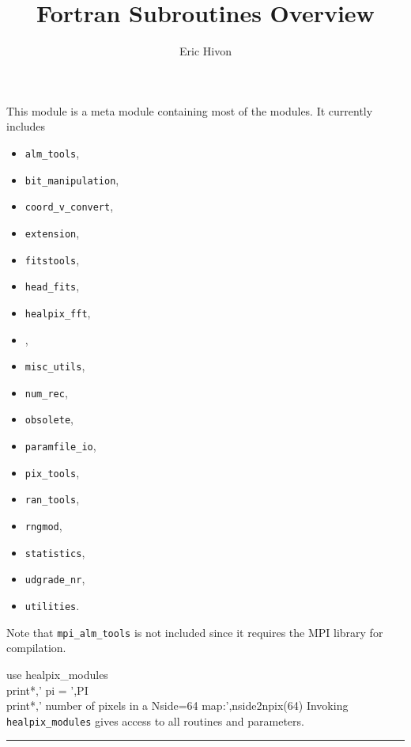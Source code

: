 
\sloppy


\title{\healpix Fortran Subroutines Overview}
 \section[healpix\_modules module]{ }
\label{sub:healpix_modules}
\author{Eric Hivon}

\begin{facility}
{This module is a meta module containing most of the \healpix modules. It currently includes
\begin{itemize}
\setlength{\itemsep}{-5pt}
  \item {\tt{alm\_tools}},
  \item {\tt{bit\_manipulation}},
  \item {\tt{coord\_v\_convert}},
  \item {\tt{extension}},
  \item {\tt{fitstools}},
  \item {\tt{head\_fits}},
  \item {\tt{healpix\_fft}},
  \item {},
  \item {\tt{misc\_utils}},
  \item {\tt{num\_rec}},
  \item {\tt{obsolete}},
  \item {\tt{paramfile\_io}},
  \item {\tt{pix\_tools}},
  \item {\tt{ran\_tools}},
  \item {\tt{rngmod}},
  \item {\tt{statistics}},
  \item {\tt{udgrade\_nr}},
  \item {\tt{utilities}}.
\end{itemize}

Note that {\tt{mpi\_alm\_tools}} is not included since it requires the MPI library for compilation.
}
{\modHealpixModules}
\end{facility}


\begin{example}
{
use healpix\_modules \\
print*,' pi = ',PI \\
print*,' number of pixels in a Nside=64 map:',nside2npix(64)
}
{
Invoking {\tt{healpix\_modules}} gives access to all \healpix routines and parameters.
}
\end{example}


\rule{\hsize}{2mm}

\newpage
